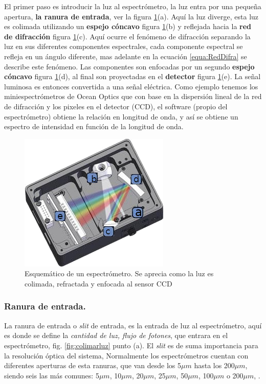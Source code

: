 El primer paso es introducir la luz al espectrómetro, la luz entra por una pequeña apertura, \textbf{la ranura de entrada}, ver la figura \ref{fig:esquematicoespectrometro}(a). Aquí la luz diverge, esta luz es colimada utilizando un \textbf{espejo cóncavo} figura \ref{fig:esquematicoespectrometro}(b) y reflejada hacia la \textbf{red de difracción} figura \ref{fig:esquematicoespectrometro}(c). Aquí ocurre el fenómeno de difracción separando la luz en sus diferentes componentes espectrales, cada componente espectral se refleja en un ángulo diferente, mas adelante en la ecuación \ref{equa:RedDifra} se describe este fenómeno.  %
Las componentes son enfocadas por un segundo \textbf{espejo cóncavo} figura \ref{fig:esquematicoespectrometro}(d), al final son proyectadas en el \textbf{detector} figura \ref{fig:esquematicoespectrometro}(e). La señal luminosa es entonces convertida a una señal eléctrica. Como ejemplo tenemos los miniespectrómetros de Ocean Optics que con base en la dispersión lineal
de la red de difracción y los pixeles en el detector (CCD), el software (propio del espectrómetro) obtiene la relación en
longitud de onda, y así se obtiene un espectro de intensidad en función de la longitud de onda.

\begin{figure}[h]
	\centering
	\includegraphics[width=0.55\linewidth]{Imagenes/Espectrometro}
	\caption[Esquema de un espectrómetro.]{Esquemático de un espectrómetro. Se aprecia como la luz es colimada, refractada y enfocada al sensor CCD \cite{BWTEK}}
	\label{fig:esquematicoespectrometro}
\end{figure}

\subsubsection{Ranura de entrada.}
La ranura de entrada o \textit{slit} de entrada, es la entrada de luz al espectrómetro, aquí es donde se define la \textit{cantidad de luz, flujo de fotones}, que entrara en el espectrómetro, fig. \ref{fig:colimarluz} punto (a).
El \textit{slit} es de suma importancia para la resolución óptica del sistema, Normalmente los espectrómetros cuentan con diferentes aperturas de esta ranuras, que van desde los 5$\mu m$ hasta los 200$\mu m$, siendo seis las más comunes: 5$\mu m$, 10$\mu m$, 20$\mu m$, 25$\mu m$, 50$\mu m$, 100$\mu m$ o 200$\mu m$, \cite{Oceana}.

